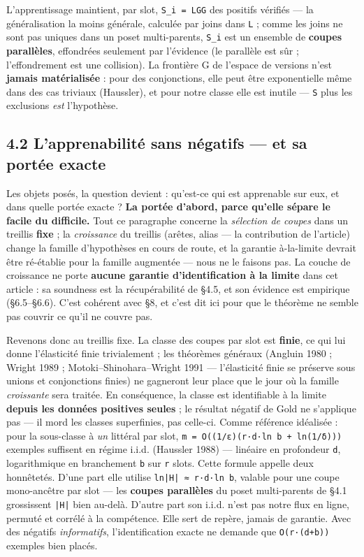 \documentclass[11pt]{article}
\begin{document}
L'apprentissage maintient, par slot, \texttt{S\_i = LGG} des positifs vérifiés — la généralisation la moins générale, calculée par joins dans \texttt{L} ; comme les joins ne sont pas uniques dans un poset multi-parents, \texttt{S\_i} est un ensemble de \textbf{coupes parallèles}, effondrées seulement par l'évidence (le parallèle est sûr ; l'effondrement est une collision). La frontière G de l'espace de versions n'est \textbf{jamais matérialisée} : pour des conjonctions, elle peut être exponentielle même dans des cas triviaux (Haussler), et pour notre classe elle est inutile — \texttt{S} plus les exclusions \emph{est} l'hypothèse.

\subsection*{4.2 L'apprenabilité sans négatifs — et sa portée exacte}

Les objets posés, la question devient : qu'est-ce qui est apprenable sur eux, et dans quelle portée exacte ? \textbf{La portée d'abord, parce qu'elle sépare le facile du difficile.} Tout ce paragraphe concerne la \emph{sélection de coupes} dans un treillis \textbf{fixe} ; la \emph{croissance} du treillis (arêtes, alias — la contribution de l'article) change la famille d'hypothèses en cours de route, et la garantie à-la-limite devrait être ré-établie pour la famille augmentée — nous ne le faisons pas. La couche de croissance ne porte \textbf{aucune garantie d'identification à la limite} dans cet article : sa soundness est la récupérabilité de §4.5, et son évidence est empirique (§6.5–§6.6). C'est cohérent avec §8, et c'est dit ici pour que le théorème ne semble pas couvrir ce qu'il ne couvre pas.

Revenons donc au treillis fixe. La classe des coupes par slot est \textbf{finie}, ce qui lui donne l'élasticité finie trivialement ; les théorèmes généraux (Angluin 1980 ; Wright 1989 ; Motoki–Shinohara–Wright 1991 — l'élasticité finie se préserve sous unions et conjonctions finies) ne gagneront leur place que le jour où la famille \emph{croissante} sera traitée. En conséquence, la classe est identifiable à la limite \textbf{depuis les données positives seules} ; le résultat négatif de Gold ne s'applique pas — il mord les classes superfinies, pas celle-ci. Comme référence idéalisée : pour la sous-classe à \emph{un} littéral par slot, \texttt{m = O((1/\allowbreak{}ε)(r·d·ln b + ln(1/\allowbreak{}δ)))} exemples suffisent en régime i.i.d. (Haussler 1988) — linéaire en profondeur \texttt{d}, logarithmique en branchement \texttt{b} sur \texttt{r} slots. Cette formule appelle deux honnêtetés. D'une part elle utilise \texttt{ln|H| ≈ r·d·ln b}, valable pour une coupe mono-ancêtre par slot — les \textbf{coupes parallèles} du poset multi-parents de §4.1 grossissent \texttt{|H|} bien au-delà. D'autre part son i.i.d. n'est pas notre flux en ligne, permuté et corrélé à la compétence. Elle sert de repère, jamais de garantie. Avec des négatifs \emph{informatifs}, l'identification exacte ne demande que \texttt{O(r·(d+b))} exemples bien placés.
\end{document}
